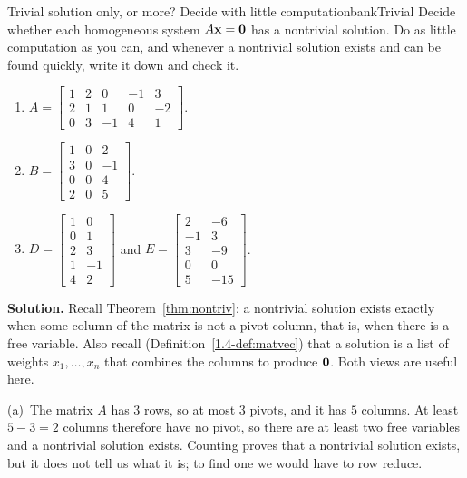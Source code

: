 \documentclass[11pt]{article}
\begin{document}
\begin{exmp}{Trivial solution only, or more? Decide with little computation}{bankTrivial}
Decide whether each homogeneous system $A\mathbf{x}=\mathbf{0}$ has a nontrivial solution. Do as little computation as you can, and whenever a nontrivial solution exists and can be found quickly, write it down and check it.
\begin{enumerate}[label=(\alph*),itemsep=2pt]
  \item $A=\begin{bmatrix}1&2&0&-1&3\\2&1&1&0&-2\\0&3&-1&4&1\end{bmatrix}$.
  \item $B=\begin{bmatrix}1&0&2\\3&0&-1\\0&0&4\\2&0&5\end{bmatrix}$.
  \item $D=\begin{bmatrix}1&0\\0&1\\2&3\\1&-1\\4&2\end{bmatrix}$ and $E=\begin{bmatrix}2&-6\\-1&3\\3&-9\\0&0\\5&-15\end{bmatrix}$.
\end{enumerate}

\textbf{Solution.} Recall Theorem~\ref{thm:nontriv}: a nontrivial solution exists exactly when some column of the matrix is not a pivot column, that is, when there is a free variable. Also recall (Definition~\ref{1.4-def:matvec}) that a solution is a list of weights $x_1,\dots,x_n$ that combines the columns to produce $\mathbf{0}$. Both views are useful here.

(a)~The matrix $A$ has $3$ rows, so at most $3$ pivots, and it has $5$ columns. At least $5-3=2$ columns therefore have no pivot, so there are at least two free variables and a nontrivial solution exists. Counting proves that a nontrivial solution exists, but it does not tell us what it is; to find one we would have to row reduce.


\end{exmp}
\end{document}
